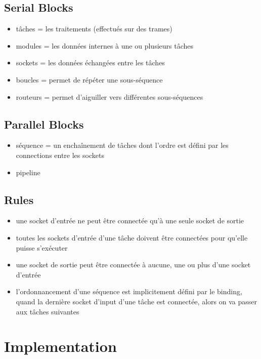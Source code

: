 \subsection{Serial Blocks}

\begin{itemize}
  \item tâches = les traitements (effectués sur des trames)
  \item modules = les données internes à une ou plusieurs tâches
  \item sockets = les données échangées entre les tâches
  \item boucles = permet de répéter une sous-séquence
  \item routeurs = permet d'aiguiller vers différentes sous-séquences
\end{itemize}

\subsection{Parallel Blocks}

\begin{itemize}
  \item séquence = un enchaînement de tâches dont l'ordre est défini par les
        connections entre les sockets
  \item pipeline
\end{itemize}

\subsection{Rules}

\begin{itemize}
  \item une socket d'entrée ne peut être connectée qu'à une seule socket de
    sortie
  \item toutes les sockets d'entrée d'une tâche doivent être connectées pour
    qu'elle puisse s'exécuter
  \item une socket de sortie peut être connectée à aucune, une ou plus d'une
    socket d'entrée
  \item l'ordonnancement d'une séquence est implicitement défini par le binding,
    quand la dernière socket d'input d'une tâche est connectée, alors on va
    passer aux tâches suivantes
\end{itemize}

\section{Implementation}

